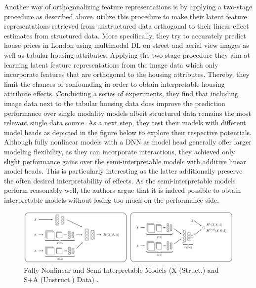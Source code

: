 \documentclass[
]{krantz}
\begin{document}
Another way of orthogonalizing feature representations is by applying a two-stage procedure as described above. \citet{Law2019} utilize this procedure to make their latent feature representations retrieved from unstructured data orthogonal to their linear effect estimates from structured data. More specifically, they try to accurately predict house prices in London using multimodal DL on street and aerial view images as well as tabular housing attributes. Applying the two-stage procedure they aim at learning latent feature representations from the image data which only incorporate features that are orthogonal to the housing attributes. Thereby, they limit the chances of confounding in order to obtain interpretable housing attribute effects. Conducting a series of experiments, they find that including image data next to the tabular housing data does improve the prediction performance over single modality models albeit structured data remains the most relevant single data source. As a next step, they test their models with different model heads as depicted in the figure below to explore their respective potentials. Although fully nonlinear models with a DNN as model head generally offer larger modeling flexibility, as they can incorporate interactions, they achieved only slight performance gains over the semi-interpretable models with additive linear model heads. This is particularly interesting as the latter additionally preserve the often desired interpretability of effects. As the semi-interpretable models perform reasonably well, the authors argue that it is indeed possible to obtain interpretable models without losing too much on the performance side.

\begin{figure}

{\centering \includegraphics[width=1\linewidth]{figures/03-02-struc+unstruc-data/Model_Heads} 

}

\caption{Fully Nonlinear and Semi-Interpretable Models (X (Struct.) and S+A (Unstruct.) Data) \citep{Law2019}.}\label{fig:model-heads}
\end{figure}
\end{document}
